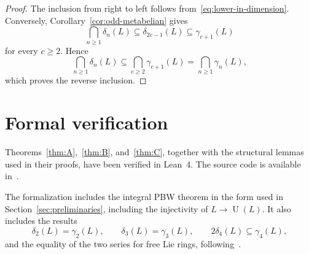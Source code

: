 \documentclass[a4paper,11pt,reqno]{amsart}
\theoremstyle{definition}
\newcommand{\U}{\operatorname U}
\begin{document}
\begin{proof}
The inclusion from right to left follows
from~\eqref{eq:lower-in-dimension}.  Conversely,
Corollary~\ref{cor:odd-metabelian} gives
\[
 \bigcap_{n\geq1}\delta_n(L)
 \subseteq\delta_{2c-1}(L)
 \subseteq\gamma_{c+1}(L)
 \]
for every $c\geq2$.  Hence
\[
 \bigcap_{n\geq1}\delta_n(L)
 \subseteq\bigcap_{c\geq2}\gamma_{c+1}(L)
 =\bigcap_{n\geq1}\gamma_n(L),
\]
which proves the reverse inclusion.
\end{proof}

\section{Formal verification}\label{sec:formalization}

Theorems~\ref{thm:A},~\ref{thm:B}, and~\ref{thm:C}, together with the
structural lemmas used in their proofs, have been verified in Lean~4.  The
source code is available in~\cite{IoninPetrovLean2026}.

The formalization includes the integral PBW theorem in the form used in
Section~\ref{sec:preliminaries}, including the injectivity of
$L\to\U(L)$.  It also includes the results
\[
 \delta_2(L)=\gamma_2(L),
 \qquad
 \delta_3(L)=\gamma_3(L),
 \qquad
 2\delta_4(L)\subseteq\gamma_4(L),
\]
and the equality of the two series for free Lie rings,
following~\cite{BartholdiPassi2015}.



\end{document}
